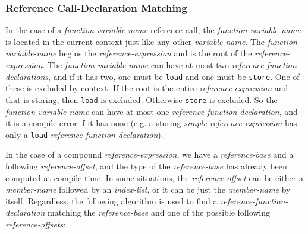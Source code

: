 \documentclass[12pt]{article}
\begin{document}
\subsubsection{Reference Call-Declaration Matching}
\label{REFERENCE-CALL-DECLARATION-MATCHING}

In the case of a {\em function-variable-name} reference call,
the {\em function-variable-name} is located in the current
context just like any other {\em variable-name}.
The {\em function-variable-name} begins the {\em reference-expression}
and is the root of the {\em reference-expression}.
The {\em function-variable-name} can have at most two
{\em reference-function-declarations}, and if it has two, one must
be {\tt load} and one must be {\tt store}.  One of these is excluded
by context.  If the root is the entire {\em reference-expression} and
that is storing, then {\tt load} is excluded.  Otherwise {\tt store}
is excluded.  So the {\em function-variable-name} can have at most
one {\em reference-function-declaration}, and it is a compile error
if it has none (e.g. a storing {\em simple-reference-expression}
has only a {\tt load} {\em reference-function-declaration}).

In the case of a compound {\em reference-expression}, we have a
{\em reference-base} and a following {\em reference-offset}, and the type
of the {\em reference-base} has already been computed at compile-time.
In some situations, the {\em reference-offset} can be either a
{\em member-name} followed by an {\em index-list}, or it can be just
the {\em member-name} by itself.  Regardless, the following algorithm
is used to find a {\em reference-function-declaration} matching the
{\em reference-base} and one of the possible following
{\em reference-offsets}:

\bigskip
\end{document}
